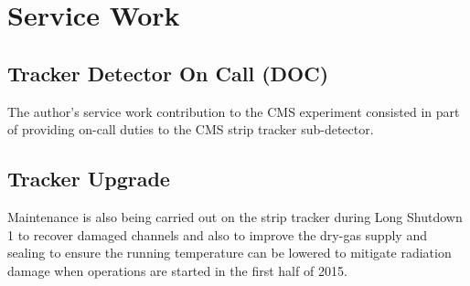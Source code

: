 \chapter{Service Work}
\label{c:service_work}

\section{Tracker Detector On Call (DOC)}
\label{s:tracker_doc}
The author's service work contribution to the CMS experiment consisted in part of providing on-call duties to
the CMS strip tracker sub-detector.

\section{Tracker Upgrade}
\label{s:tracker_upgrade}
Maintenance is also being carried out on the strip tracker during Long Shutdown 1 to recover damaged channels
and also to improve the dry-gas supply and sealing to ensure the running temperature can be lowered to
mitigate radiation damage when operations are started in the first half of 2015.

